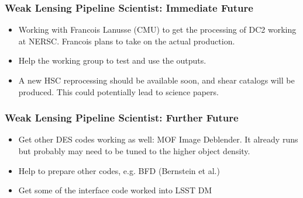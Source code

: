 \documentclass[aspectratio=169]{beamer}
\begin{document}
\frame
{

    \frametitle{Weak Lensing Pipeline Scientist: Immediate Future}


    \begin{itemize}

        \item Working with Francois Lanusse (CMU) to get the processing
            of DC2 working at NERSC. Francois plans to take on the
            actual production.

        \item Help the working group to test and use the outputs.

        \item A new HSC reprocessing should be available soon, and
            shear catalogs will be produced.  This could 
            potentially lead to science papers.


    \end{itemize}
}

\frame
{

    \frametitle{Weak Lensing Pipeline Scientist: Further Future}


    \begin{itemize}

        \item Get other DES codes working as well: MOF Image Deblender. It already
            runs but probably may need to be tuned to the higher object density.

        \item Help to prepare other codes, e.g. BFD (Bernstein et al.)

        \item Get some of the interface code worked into LSST DM

    \end{itemize}
}
\end{document}
